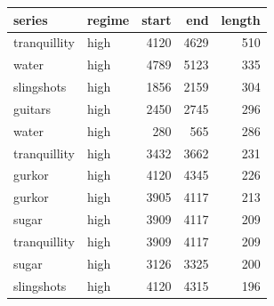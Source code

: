 \begin{tabular}{llrrr}
\toprule
series & regime & start & end & length \\
\midrule
tranquillity & high & 4120 & 4629 & 510 \\
water & high & 4789 & 5123 & 335 \\
slingshots & high & 1856 & 2159 & 304 \\
guitars & high & 2450 & 2745 & 296 \\
water & high & 280 & 565 & 286 \\
tranquillity & high & 3432 & 3662 & 231 \\
gurkor & high & 4120 & 4345 & 226 \\
gurkor & high & 3905 & 4117 & 213 \\
sugar & high & 3909 & 4117 & 209 \\
tranquillity & high & 3909 & 4117 & 209 \\
sugar & high & 3126 & 3325 & 200 \\
slingshots & high & 4120 & 4315 & 196 \\
\bottomrule
\end{tabular}
